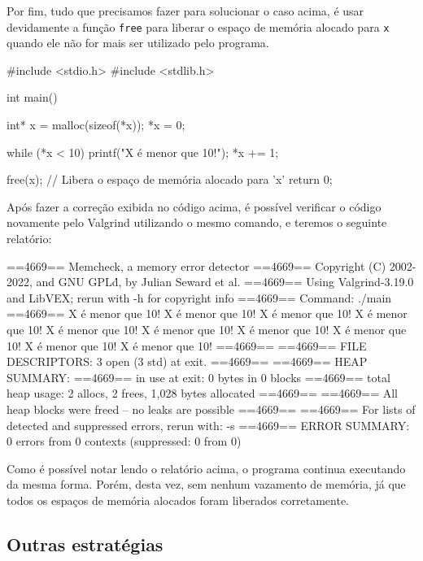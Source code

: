 Por fim, tudo que precisamos fazer para solucionar o caso acima, é usar devidamente a função \texttt{free} para liberar o espaço 
de memória alocado para \texttt{x} quando ele não for mais ser utilizado pelo programa.

\begin{excode}
    #include <stdio.h>
    #include <stdlib.h>

    int main()
    {
        int* x = malloc(sizeof(*x));
        *x = 0;

        while (*x < 10) {
            printf("X é menor que 10!\n");
            *x += 1;
        }

        free(x); // Libera o espaço de memória alocado para 'x'
        return 0;
    }
\end{excode}

Após fazer a correção exibida no código acima, é possível verificar o código novamente pelo Valgrind utilizando o mesmo comando, e 
teremos o seguinte relatório:

\newpage
\begin{exterminal}
    ==4669== Memcheck, a memory error detector
    ==4669== Copyright (C) 2002-2022, and GNU GPL\'d, by Julian Seward et al.
    ==4669== Using Valgrind-3.19.0 and LibVEX; rerun with -h for copyright info
    ==4669== Command: ./main
    ==4669== 
    X é menor que 10!
    X é menor que 10!
    X é menor que 10!
    X é menor que 10!
    X é menor que 10!
    X é menor que 10!
    X é menor que 10!
    X é menor que 10!
    X é menor que 10!
    X é menor que 10!
    ==4669== 
    ==4669== FILE DESCRIPTORS: 3 open (3 std) at exit.
    ==4669== 
    ==4669== HEAP SUMMARY:
    ==4669==     in use at exit: 0 bytes in 0 blocks
    ==4669==   total heap usage: 2 allocs, 2 frees, 1,028 bytes allocated
    ==4669== 
    ==4669== All heap blocks were freed -- no leaks are possible
    ==4669== 
    ==4669== For lists of detected and suppressed errors, rerun with: -s
    ==4669== ERROR SUMMARY: 0 errors from 0 contexts (suppressed: 0 from 0)
\end{exterminal}

Como é possível notar lendo o relatório acima, o programa continua executando da mesma forma. Porém, desta vez, sem nenhum 
vazamento de memória, já que todos os espaços de memória alocados foram liberados corretamente.

\subsection{Outras estratégias}

